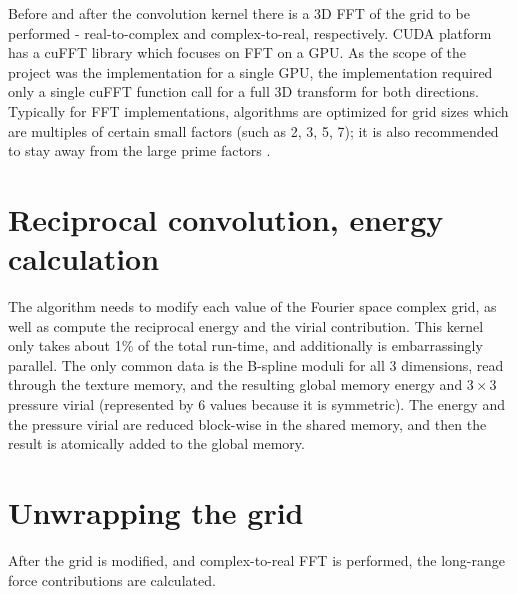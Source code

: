 \documentclass[12pt,a4paper]{report}
\newcommand{\draft}[1]{#1}
\begin{document}
Before and after the convolution kernel there is a 3D FFT of the grid to be performed - real-to-complex and complex-to-real, respectively. 
CUDA platform has a cuFFT library which focuses on FFT on a GPU. 
As the scope of the project was the implementation for a single GPU, the implementation required only a single cuFFT function call for a full 3D transform for both directions. 
Typically for FFT implementations, algorithms are optimized for grid sizes which are multiples of certain small factors (such as 2, 3, 5, 7); it is also recommended to stay away from the large prime factors \cite{cufft}.

\section{Reciprocal convolution, energy calculation}


The algorithm needs to modify each value of the Fourier space complex grid, as well as compute the reciprocal energy and the virial contribution. This kernel only takes about \draft{1\%} of the total run-time, and additionally is embarrassingly parallel. The only common data is the B-spline moduli for all 3 dimensions, read through the texture memory, and the resulting global memory energy and $3 \times 3$ pressure virial (represented by 6 values because it is symmetric). The energy and the pressure virial are reduced block-wise in the shared memory, and then the result is atomically added to the global memory.

\section{Unwrapping the grid}
After the grid is modified, and complex-to-real FFT is performed, the long-range force contributions are calculated.
\end{document}
